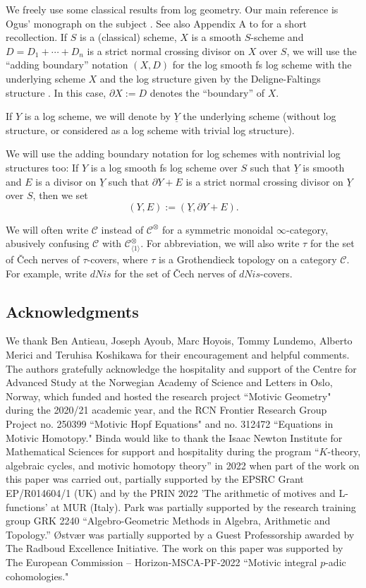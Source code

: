 \documentclass[11pt, a4paper]{amsart}
\theoremstyle{definition}
\numberwithin{equation}{subsection}
\renewcommand{\ul}{\underline}
\newcommand{\cC}{\mathcal{C}}
\newcommand{\infC}{\mathcal{C}}
\begin{document}
We freely use some classical results from log geometry. Our main reference is Ogus' monograph on the subject \cite{Ogu}. See also Appendix A to \cite{logDM} for a short recollection. If $S$ is a (classical) scheme, $X$ is a smooth $S$-scheme and $D=D_1+\cdots +D_n$ is a strict normal crossing divisor on $X$ over $S$, we will use the ``adding boundary'' notation $(X,D)$ for the log smooth fs log scheme
with the underlying scheme $X$ and the log structure given by the Deligne-Faltings structure \cite[\S III.1.7]{Ogu}.
In this case, $\partial X:=D$ denotes the ``boundary'' of $X$.

If $Y$ is a log scheme, we will denote by $\underline{Y}$ the underlying scheme (without log structure, or considered as a log scheme with trivial log structure).

We will use the adding boundary notation for log schemes with nontrivial log structures too: If $Y$ is a log smooth fs log scheme over $S$ such that $\ul{Y}$ is smooth and $E$ is a divisor on $\ul{Y}$ such that $\partial Y+E$ is a strict normal crossing divisor on $\ul{Y}$ over $S$,
then we set
\[
(Y,E)
:=
(\ul{Y},\partial Y+E).
\]


We will often write $\infC$ instead of $\infC^\otimes$ for a symmetric monoidal $\infty$-category, abusively confusing $\infC$ with $\infC^{\otimes}_{\langle1\rangle}$.
For abbreviation, we will also write $\tau$ for the set of  \v{C}ech nerves of $\tau$-covers, where $\tau$ is a Grothendieck topology on a category $\cC$. For example, write $dNis$ for the set of  \v{C}ech nerves of $dNis$-covers.

\subsection{Acknowledgments}
We thank Ben Antieau, Joseph Ayoub, Marc Hoyois, Tommy Lundemo,  Alberto Merici and Teruhisa Koshikawa
for their encouragement and helpful comments.
The authors gratefully acknowledge the hospitality and support of the 
Centre for Advanced Study at the Norwegian Academy of Science and Letters in Oslo, Norway, 
which funded and hosted the research project “Motivic Geometry" during the 2020/21 academic year, 
and the RCN Frontier Research Group Project no. 250399 “Motivic Hopf Equations" and 
no. 312472 “Equations in Motivic Homotopy."
Binda would like to thank the Isaac Newton Institute for Mathematical Sciences for support and hospitality during the program ``$K$-theory, algebraic cycles, and motivic homotopy theory'' in 2022 when part of the work on this paper was carried out,
partially supported by the EPSRC Grant EP/R014604/1 (UK) and by the PRIN 2022 'The arithmetic of motives and L-functions' at MUR (Italy).  
Park was partially supported by the research training group GRK 2240 ``Algebro-Geometric Methods in Algebra, 
Arithmetic and Topology.''
{\O}stv{\ae}r was partially supported by a Guest Professorship awarded by The Radboud Excellence Initiative.
The work on this paper was supported by The European Commission -- Horizon-MSCA-PF-2022 
``Motivic integral $p$-adic cohomologies."
\end{document}
